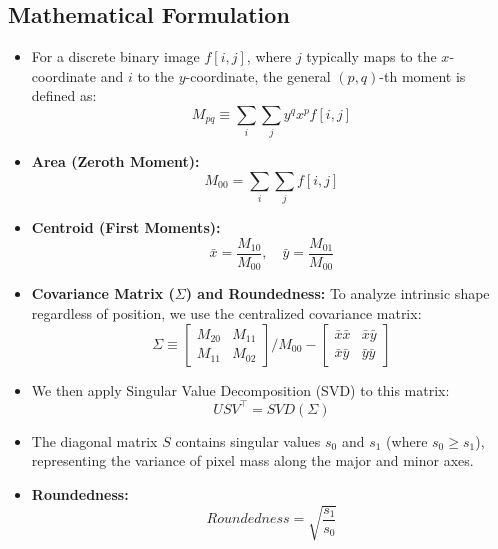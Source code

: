 \documentclass[12pt]{article}
\begin{document}
\subsection{Mathematical Formulation}
\begin{itemize}
    \item For a discrete binary image $f[i,j]$, where $j$ typically maps to the $x$-coordinate and $i$ to the $y$-coordinate, the general $(p,q)$-th moment is defined as:
          \[
              M_{pq} \equiv \sum_{i} \sum_{j} y^q x^p f[i,j]
          \]

    \item \textbf{Area (Zeroth Moment):}
          \[
              M_{00} = \sum_{i} \sum_{j} f[i,j]
          \]

    \item \textbf{Centroid (First Moments):}
          \[
              \bar{x} = \frac{M_{10}}{M_{00}}, \quad \bar{y} = \frac{M_{01}}{M_{00}}
          \]

    \item \textbf{Covariance Matrix ($\Sigma$) and Roundedness:} To analyze intrinsic shape regardless of position, we use the centralized covariance matrix:
          \[
              \Sigma \equiv
              \begin{bmatrix} M_{20} & M_{11} \\ M_{11} & M_{02} \end{bmatrix} / M_{00}
              -
              \begin{bmatrix} \bar{x}\bar{x} & \bar{x}\bar{y} \\ \bar{x}\bar{y} & \bar{y}\bar{y} \end{bmatrix}
          \]

    \item We then apply Singular Value Decomposition (SVD) to this matrix:
          \[
              USV^\top = SVD(\Sigma)
          \]

    \item The diagonal matrix $S$ contains singular values $s_0$ and $s_1$ (where $s_0 \ge s_1$), representing the variance of pixel mass along the major and minor axes.

    \item \textbf{Roundedness:}
          \[
              Roundedness = \sqrt{\frac{s_1}{s_0}}
          \]
\end{itemize}
\end{document}
